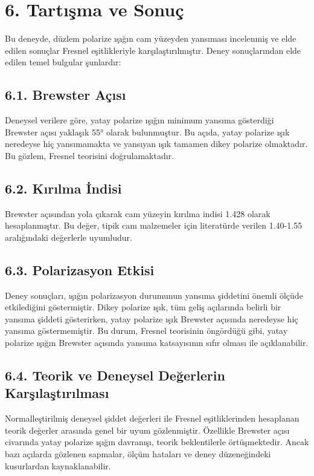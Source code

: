 \documentclass[11pt,letterpaper,twocolumn]{fenbil}
\begin{document}
\section*{6. Tartışma ve Sonuç}
Bu deneyde, düzlem polarize ışığın cam yüzeyden yansıması incelenmiş ve elde edilen sonuçlar Fresnel eşitlikleriyle karşılaştırılmıştır. Deney sonuçlarından elde edilen temel bulgular şunlardır:

\subsection*{6.1. Brewster Açısı}
Deneysel verilere göre, yatay polarize ışığın minimum yansıma gösterdiği Brewster açısı yaklaşık 55° olarak bulunmuştur. Bu açıda, yatay polarize ışık neredeyse hiç yansımamakta ve yansıyan ışık tamamen dikey polarize olmaktadır. Bu gözlem, Fresnel teorisini doğrulamaktadır.

\subsection*{6.2. Kırılma İndisi}
Brewster açısından yola çıkarak cam yüzeyin kırılma indisi 1.428 olarak hesaplanmıştır. Bu değer, tipik cam malzemeler için literatürde verilen 1.40-1.55 aralığındaki değerlerle uyumludur.

\subsection*{6.3. Polarizasyon Etkisi}
Deney sonuçları, ışığın polarizasyon durumunun yansıma şiddetini önemli ölçüde etkilediğini göstermiştir. Dikey polarize ışık, tüm geliş açılarında belirli bir yansıma şiddeti gösterirken, yatay polarize ışık Brewster açısında neredeyse hiç yansıma göstermemiştir. Bu durum, Fresnel teorisinin öngördüğü gibi, yatay polarize ışığın Brewster açısında yansıma katsayısının sıfır olması ile açıklanabilir.

\subsection*{6.4. Teorik ve Deneysel Değerlerin Karşılaştırılması}
Normalleştirilmiş deneysel şiddet değerleri ile Fresnel eşitliklerinden hesaplanan teorik değerler arasında genel bir uyum gözlenmiştir. Özellikle Brewster açısı civarında yatay polarize ışığın davranışı, teorik beklentilerle örtüşmektedir. Ancak bazı açılarda gözlenen sapmalar, ölçüm hataları ve deney düzeneğindeki kusurlardan kaynaklanabilir.
\end{document}
